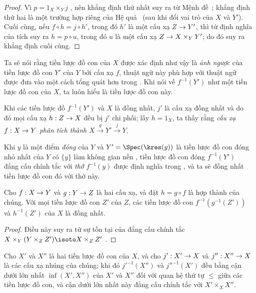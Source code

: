 \documentclass[oneside]{amsart}
\makeatletter
\renewcommand{\leq}{\leqslant}
\newcommand{\ega@arrow}[2]{\mathchoice{#1}{#2}{#2}{#2}}
\renewcommand{\to}{\ega@arrow{\longrightarrow}{\rightarrow}}
\newcommand{\oldpage}[2][]{{\marginnote{\normalfont\textbf{#1}~|~#2}}\ignorespaces}
\let\EGAOriginalLabel\label
\renewcommand{\label}[1]{\phantomsection\EGAOriginalLabel{#1}}
\makeatother
\begin{document}
\begin{proof}
Vì $p=1_X\times_Y j$ , nên khẳng định thứ nhất suy ra từ Mệnh đề~;
khẳng định thứ hai là một trường hợp riêng của Hệ quả~ (sau khi đổi vai trò của $X$ và $Y'$).
Cuối cùng, nếu $f\circ h=j\circ h'$, trong đó $h'$ là một cấu xạ $Z\to Y'$, thì từ định nghĩa của tích suy ra $h=p\circ u$, trong đó $u$ là một cấu xạ $Z\to X\times_Y Y'$; do đó suy ra khẳng định cuối cùng.
\end{proof}

Ta sẽ nói rằng tiền lược đồ con của $X$ được xác định như vậy là \emph{ảnh ngược} của tiền lược đồ con $Y'$ của $Y$ bởi cấu xạ $f$, thuật ngữ này phù hợp với thuật ngữ được đưa vào
\oldpage[I]{126}
một cách tổng quát hơn trong .
Khi nói về $f^{-1}(Y')$ như một tiền lược đồ con của $X$, ta luôn hiểu là tiền lược đồ con này.

Khi các tiền lược đồ $f^{-1}(Y')$ và $X$ là đồng nhất, $j'$ là cấu xạ đồng nhất và do đó mọi cấu xạ $h:Z\to X$ đều bị $j'$ chi phối; lấy $h=1_X$, ta thấy rằng \emph{cấu xạ $f:X\to Y$ phân tích thành $X\xrightarrow{g}Y'\xrightarrow{j}Y$}.

Khi $y$ là một điểm \emph{đóng} của $Y$ và $Y'=\Spec(\kres(y))$ là tiền lược đồ con đóng nhỏ nhất của $Y$ có $\{y\}$ làm không gian nền , tiền lược đồ con đóng $f^{-1}(Y')$ đẳng cấu chính tắc với \emph{thớ} $f^{-1}(y)$ được định nghĩa trong , và ta sẽ đồng nhất tiền lược đồ con đó với thớ này.

\begin{corollary}[4.4.2]
\label{I.4.4.2}
Cho $f:X\to Y$ và $g:Y\to Z$ là hai cấu xạ, và đặt $h=g\circ f$ là hợp thành của chúng.
Với mọi tiền lược đồ con $Z'$ của $Z$, các tiền lược đồ con $f^{-1}(g^{-1}(Z'))$ và $h^{-1}(Z')$ của $X$ là đồng nhất.
\end{corollary}

\begin{proof}
Điều này suy ra từ sự tồn tại của đẳng cấu chính tắc $X\times_Y(Y\times_Z Z')\isoto X\times_Z Z'$ .
\end{proof}

\begin{corollary}[4.4.3]
\label{I.4.4.3}
Cho $X'$ và $X''$ là hai tiền lược đồ con của $X$, và cho $j':X'\to X$ và $j'':X''\to X$ là các cấu xạ nhúng của chúng;
khi đó ${j'}^{-1}(X'')$ và ${j''}^{-1}(X')$ đều bằng cận dưới lớn nhất $\inf(X',X'')$ của $X'$ và $X''$ đối với quan hệ thứ tự $\leq$ giữa các tiền lược đồ con, và cận dưới lớn nhất này đẳng cấu chính tắc với $X'\times_X X''$.
\end{corollary}
\end{document}
